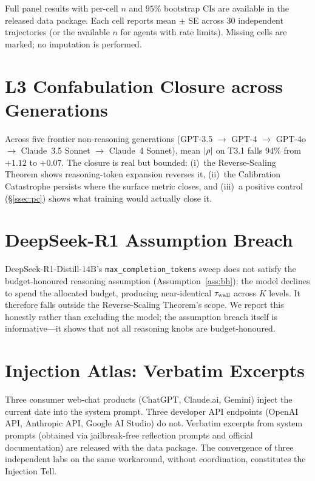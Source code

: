 \documentclass{article}
\begin{document}
Full panel results with per-cell $n$ and $95\%$ bootstrap CIs are available in the released data package. Each cell reports mean $\pm$ SE across 30 independent trajectories (or the available $n$ for agents with rate limits). Missing cells are marked; no imputation is performed.

\section{L3 Confabulation Closure across Generations}\label{app:closure}

Across five frontier non-reasoning generations (GPT-3.5 $\to$ GPT-4 $\to$ GPT-4o $\to$ Claude~3.5 Sonnet $\to$ Claude~4 Sonnet), mean $|\rho|$ on T3.1 falls $94\%$ from $+1.12$ to $+0.07$. The closure is real but bounded: (i)~the Reverse-Scaling Theorem shows reasoning-token expansion reverses it, (ii)~the Calibration Catastrophe persists where the surface metric closes, and (iii)~a positive control (\S\ref{ssec:pc}) shows what training would actually close it.

\section{DeepSeek-R1 Assumption Breach}\label{app:deepseek}

DeepSeek-R1-Distill-14B's \texttt{max\_completion\_tokens} sweep does not satisfy the budget-honoured reasoning assumption (Assumption~\ref{ass:bh}): the model declines to spend the allocated budget, producing near-identical $\tau_{\mathrm{wall}}$ across $K$ levels. It therefore falls outside the Reverse-Scaling Theorem's scope. We report this honestly rather than excluding the model; the assumption breach itself is informative---it shows that not all reasoning knobs are budget-honoured.

\section{Injection Atlas: Verbatim Excerpts}\label{app:atlas}

Three consumer web-chat products (ChatGPT, Claude.ai, Gemini) inject the current date into the system prompt. Three developer API endpoints (OpenAI API, Anthropic API, Google AI Studio) do not. Verbatim excerpts from system prompts (obtained via jailbreak-free reflection prompts and official documentation) are released with the data package. The convergence of three independent labs on the same workaround, without coordination, constitutes the Injection Tell.
\end{document}

